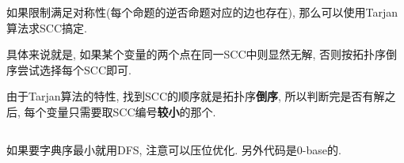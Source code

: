 如果限制满足对称性(每个命题的逆否命题对应的边也存在), 那么可以使用Tarjan算法求SCC搞定. 

具体来说就是, 如果某个变量的两个点在同一SCC中则显然无解, 否则按拓扑序倒序尝试选择每个SCC即可.

由于Tarjan算法的特性, 找到SCC的顺序就是拓扑序\textbf{倒序}, 所以判断完是否有解之后, 每个变量只需要取SCC编号\textbf{较小}的那个.

\inputminted{cpp}{../src/graph/2sat-tarjan.cpp}

如果要字典序最小就用DFS, 注意可以压位优化. 另外代码是0-base的.

\inputminted{cpp}{../src/graph/2sat.cpp}